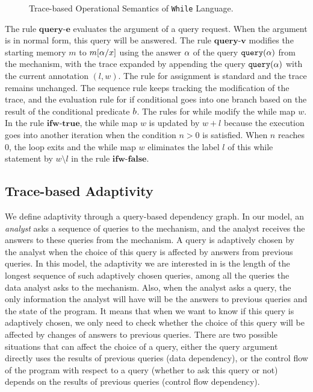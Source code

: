 \documentclass[a4paper,11pt]{article}
\begin{document}
\begin{figure}
	    \caption{Trace-based Operational Semantics of {\tt While} Language.}
    	\label{fig:evaluation}
	\end{figure}
%
%
%
The rule $\textbf{query-e}$ evaluates the argument of a query request. When the argument is in normal form, this query will be answered.
%
The rule $\textbf{query-v}$ modifies the starting memory $m$ to $m[\alpha/x]$ using the answer $\alpha$ of the query ${\tt query}(\alpha)$ from the mechanism, 
with the trace expanded by appending the query ${\tt query}(\alpha)$ with the current annotation $(l,w)$. 
%
The rule for assignment is standard and the trace remains unchanged.%
The sequence rule keeps tracking the modification of the trace, and the evaluation rule for if conditional goes into one branch based on the result of the conditional predicate $b$. 
%
The rules for while modify the while map $w$. 
In the rule $\textbf{ifw-true}$, the while map $w$ is updated by $w + l$ because the execution goes into another iteration when the condition $n >0$ is satisfied. 
%
When $n$ reaches $0$, the loop exits and the while map $w$ eliminates the label $l$ of this while statement by $w \setminus l$ in the rule $\textbf{ifw-false}$.  
%
\subsection{ Trace-based Adaptivity}
%
We define adaptivity through a query-based dependency graph. In our model, an \emph{analyst} asks a sequence of queries to the mechanism, and the analyst receives the answers to these queries from the mechanism. A query is adaptively chosen by the analyst when the choice of this query is affected by answers from previous queries. In this model, the adaptivity we are interested in is the length of the longest sequence of such adaptively chosen queries, among all the queries the data analyst asks to the mechanism.  Also, when the analyst asks a query, the only information the analyst will have will be the answers to previous queries and the state of the program. It means that when we want to know if this query is adaptively chosen, we only need to check whether the choice of this query will be affected by changes of answers to previous queries. There are two possible situations that can  affect the choice of a query,  
either the query argument directly uses the results of previous queries (data dependency), or the control flow of the program with respect to a query (whether to ask this query or not) depends on the results of previous queries (control flow dependency).
\end{document}
